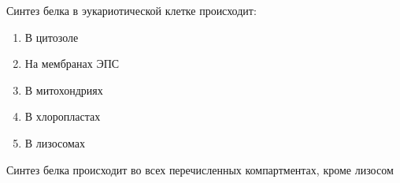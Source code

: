 
Синтез белка в эукариотической клетке происходит:

\begin{enumerate}
    \item В цитозоле
    \item На мембранах ЭПС
    \item В митохондриях
    \item В хлоропластах
    \item В лизосомах
\end{enumerate}

\explanationSection

Синтез белка происходит во всех перечисленных компартментах, кроме лизосом

